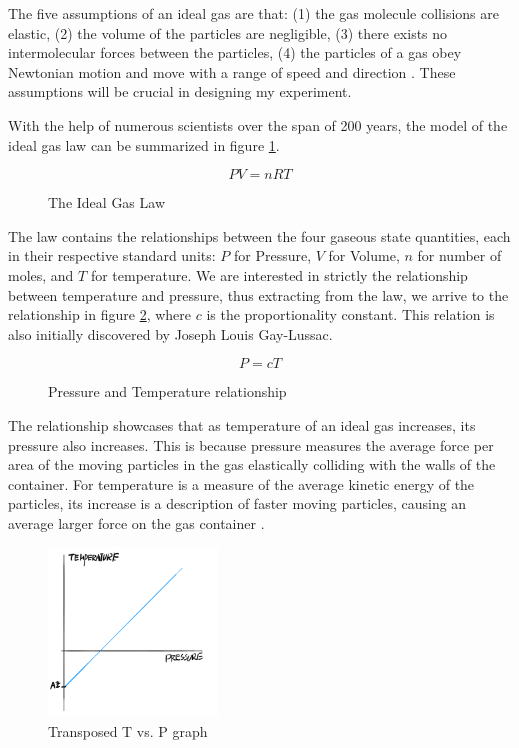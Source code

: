 \documentclass[a4paper,12pt]{article}
\begin{document}
The five assumptions of an ideal gas are that: (1) the gas molecule collisions are elastic, (2) the volume of the particles are negligible, (3) there exists no intermolecular forces between the particles, (4) the particles of a gas obey Newtonian motion and move with a range of speed and direction \parencite{gas_law}. These assumptions will be crucial in designing my experiment.

With the help of numerous scientists over the span of 200 years, the model of the ideal gas law can be summarized in figure \ref{fig:igl}.

\begin{figure}[H]
    \[
    PV = nRT
    \]
    \caption{The Ideal Gas Law}
    \label{fig:igl}
\end{figure}

The law contains the relationships between the four gaseous state quantities, each in their respective standard units: $P$ for Pressure, $V$ for Volume, $n$ for number of moles, and $T$ for temperature. We are interested in strictly the relationship between temperature and pressure, thus extracting from the law, we arrive to the relationship in figure \ref{fig:pt}, where $c$ is the proportionality constant. This relation is also initially discovered by Joseph Louis Gay-Lussac.

\begin{figure}[H]
    \[
    P = cT
    \]
    \caption{Pressure and Temperature relationship}
    \label{fig:pt}
\end{figure}

The relationship showcases that as temperature of an ideal gas increases, its pressure also increases. This is because pressure measures the average force per area of the moving particles in the gas elastically colliding with the walls of the container. For temperature is a measure of the average kinetic energy of the particles, its increase is a description of faster moving particles, causing an average larger force on the gas container \parencite{pearson}.



\begin{figure}
    \centering
    \includegraphics[width=0.4\textwidth]{assets/az.png}
    \caption{Transposed T vs. P graph}
    \label{fig:az}
\end{figure}
\end{document}
